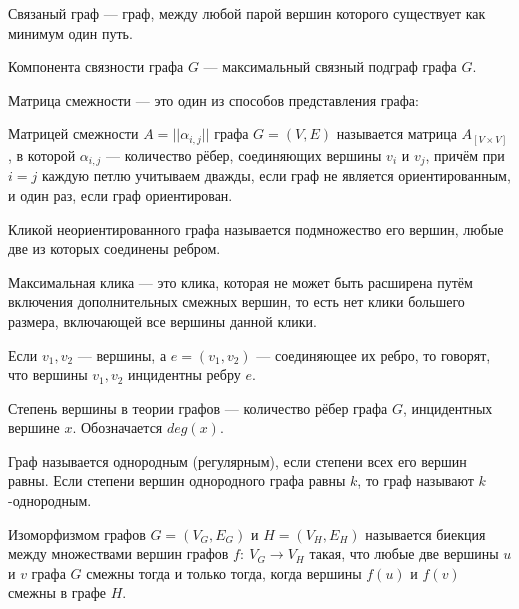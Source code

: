 \begin{my_def}
Связаный граф --- граф, между любой парой вершин которого существует как
минимум один путь.
\end{my_def}

\begin{my_def}
Компонента связности графа  $G$ --- максимальный связный подграф графа  $G$.
\end{my_def}

Матрица смежности --- это один из способов представления графа:

\begin{my_def}
Матрицей смежности $A=||\alpha_{i,j}||$ графа $G=(V,E)$ называется матрица $A_{[V\times{}V]}$, в которой $\alpha_{i,j}$ --- количество рёбер,
соединяющих вершины $v_i$ и $v_j$, причём при $i=j$ каждую петлю учитываем дважды,
если граф не является ориентированным, и один раз, если граф ориентирован.
\end{my_def}

\begin{my_def}
Кликой неориентированного графа называется подмножество его вершин, любые две из
которых соединены ребром.

Максимальная клика --- это клика, которая не может быть
расширена путём включения дополнительных смежных вершин, то есть нет клики большего
размера, включающей все вершины данной клики.
\end{my_def}

\begin{my_def}
Если $v_{1}, v_{2}$ --- вершины, а  $e=(v_{1},v_{2})$ --- соединяющее их ребро, то
говорят, что вершины $v_{1}, v_{2}$ инцидентны ребру $e$.
\end{my_def}

\begin{my_def}
Степень вершины в теории графов --- количество рёбер графа $G$, инцидентных вершине $x$.
Обозначается $deg(x)$.
\end{my_def}

\begin{my_def}
Граф называется однородным (регулярным), если степени всех его вершин равны.
Если степени вершин однородного графа равны $k$, то граф называют $k$-однородным.
\end{my_def}

\begin{my_def}
Изоморфизмом графов  $G=\left(V_{G},E_{G}\right)$  и
$H=\left(V_{H},E_{H}\right)$  называется биекция между множествами
вершин графов  $f\colon \ V_{G}\rightarrow V_{H}$ такая, что любые две вершины
$u$ и  $v$ графа  $G$ смежны тогда и только тогда, когда вершины  $f(u)$ и $f(v)$
смежны в графе  $H$.
\end{my_def}

